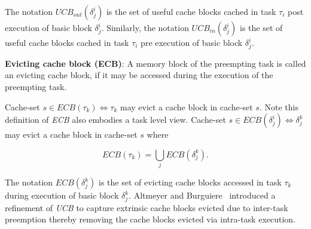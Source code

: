 \noindent The notation \begin{math}\textit{UCB}_{out}(\delta_{j}^{i})\end{math} is the set of useful cache blocks cached in task \begin{math}\tau_{i}\end{math} post execution of basic block \begin{math}\delta_{j}^{i}\end{math}.  Similarly, the notation \begin{math}\textit{UCB}_{in}(\delta_{j}^{i})\end{math} is the set of useful cache blocks cached in task \begin{math}\tau_{i}\end{math} pre execution of basic block \begin{math}\delta_{j}^{i}\end{math}.

\begin{definition}
\textbf{Evicting cache block (ECB)}: A memory block of the preempting task is called an evicting cache block, if it may be accessed during the execution of the preempting task.
\end{definition}

\noindent Cache-set \begin{math}s \in \textit{ECB}(\tau_{k}) \Leftrightarrow \tau_{k}\end{math} may evict a cache block in cache-set $s$.  Note this definition of \textit{ECB} also embodies a task level view.  Cache-set \begin{math}s \in \textit{ECB}(\delta_{j}^{i}) \Leftrightarrow \delta_{j}^{k}\end{math} may evict a cache block in cache-set $s$ where

\begin{equation}\label{eqn:ecb-task}
    \textit{ECB}(\tau_{k}) = \bigcup_{j} \textit{ECB}(\delta_{j}^{k}).
\end{equation}

\noindent The notation \begin{math}\textit{ECB}(\delta_{j}^{k})\end{math} is the set of evicting cache blocks accessed in task \begin{math}\tau_{k}\end{math} during execution of basic block \begin{math}\delta_{j}^{k}\end{math}.  Altmeyer and Burguiere~\cite{altmeyer:11c} introduced a refinement of \textit{UCB} to capture extrinsic cache blocks evicted due to inter-task preemption thereby removing the cache blocks evicted via intra-task execution.

